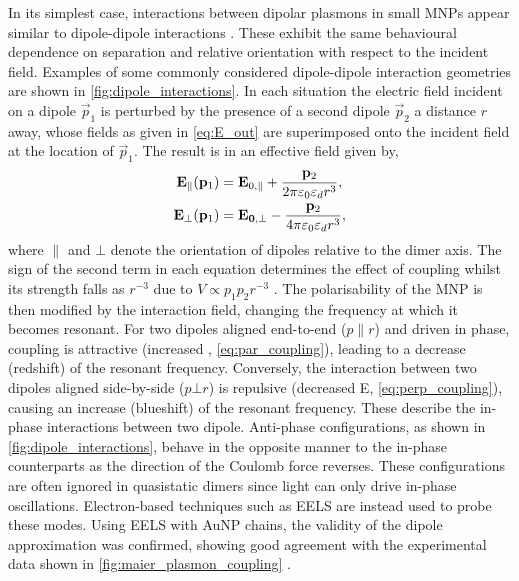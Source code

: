 \documentclass{article}
\begin{document}
In its simplest case, interactions between dipolar plasmons in small MNPs appear similar to dipole-dipole interactions \cite{kreibig1995optical, maier2002, gluodenis2002, rechberger2003, atay2004}. These exhibit the same behavioural dependence on separation and relative orientation with respect to the incident field. Examples of some commonly considered dipole-dipole interaction geometries are shown in \autoref{fig:dipole_interactions}. In each situation the electric field incident on a dipole $\vec{p}_1$ is perturbed by the presence of a second dipole $\vec{p}_2$ a distance $r$ away, whose fields as given in \eqref{eq:E_out} are superimposed onto the incident field at the location of $\vec{p}_1$. The result is in an effective field given by,
\begin{subequations}
\begin{align}
	\mathbf{E}_{\parallel}(\mathbf{p}_1) &= \mathbf{E}_{0,\parallel} + \frac{\mathbf{p}_2}{2\pi\varepsilon_0\varepsilon_d r^3}, \label{eq:par_coupling} \\
	\mathbf{E}_{\bot}(\mathbf{p}_1) &= \mathbf{E_{0,\bot}} - \frac{\mathbf{p}_2}{4\pi\varepsilon_0\varepsilon_d r^3}, \label{eq:perp_coupling}
\end{align}
\end{subequations}
where $\parallel$ and $\bot$ denote the orientation of dipoles relative to the dimer axis. The sign of the second term in each equation determines the effect of coupling whilst its strength falls as $r^{-3}$ due to $V \propto p_1p_2r^{-3}$ \cite{halas2011}. The polarisability of the MNP is then modified by the interaction field, changing the frequency at which it becomes resonant.
For two dipoles aligned end-to-end ($p \parallel r$) and driven in phase, coupling is attractive (increased , \eqref{eq:par_coupling}), leading to a decrease (redshift) of the resonant frequency. Conversely, the interaction between two dipoles aligned side-by-side ($p \bot r$) is repulsive (decreased E, \eqref{eq:perp_coupling}), causing an increase (blueshift) of the resonant frequency. These describe the in-phase interactions between two dipole. Anti-phase configurations, as shown in \autoref{fig:dipole_interactions}, behave in the opposite manner to the in-phase counterparts as the direction of the Coulomb force reverses. These configurations are often ignored in quasistatic dimers since light can only drive in-phase oscillations. Electron-based techniques such as EELS are instead used to probe these modes. Using EELS with AuNP chains, the validity of the dipole approximation was confirmed, showing good agreement with the experimental data shown in \autoref{fig:maier_plasmon_coupling} \cite{maier2002}.
\end{document}
